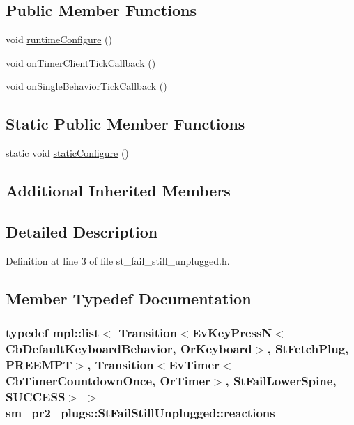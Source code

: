 \subsection*{Public Member Functions}
\begin{DoxyCompactItemize}
\item 
void \hyperlink{structsm__pr2__plugs_1_1StFailStillUnplugged_af8704d60b24ec65be825b5dc416632d1}{runtime\+Configure} ()
\item 
void \hyperlink{structsm__pr2__plugs_1_1StFailStillUnplugged_a9778180fa18c15f2d94c774ebde4c7cf}{on\+Timer\+Client\+Tick\+Callback} ()
\item 
void \hyperlink{structsm__pr2__plugs_1_1StFailStillUnplugged_ac9dc49f0681e4d6a17b30461881b9572}{on\+Single\+Behavior\+Tick\+Callback} ()
\end{DoxyCompactItemize}
\subsection*{Static Public Member Functions}
\begin{DoxyCompactItemize}
\item 
static void \hyperlink{structsm__pr2__plugs_1_1StFailStillUnplugged_a42820633846d0c87f9793a11b484d292}{static\+Configure} ()
\end{DoxyCompactItemize}
\subsection*{Additional Inherited Members}


\subsection{Detailed Description}


Definition at line 3 of file st\+\_\+fail\+\_\+still\+\_\+unplugged.\+h.



\subsection{Member Typedef Documentation}
\subsubsection[{\texorpdfstring{reactions}{reactions}}]{\setlength{\rightskip}{0pt plus 5cm}typedef mpl\+::list$<$ Transition$<$Ev\+Key\+PressN$<$Cb\+Default\+Keyboard\+Behavior, {\bf Or\+Keyboard}$>$, {\bf St\+Fetch\+Plug}, {\bf P\+R\+E\+E\+M\+PT}$>$, Transition$<$Ev\+Timer$<$Cb\+Timer\+Countdown\+Once, {\bf Or\+Timer}$>$, {\bf St\+Fail\+Lower\+Spine}, {\bf S\+U\+C\+C\+E\+SS}$>$ $>$ {\bf sm\+\_\+pr2\+\_\+plugs\+::\+St\+Fail\+Still\+Unplugged\+::reactions}}\hypertarget{structsm__pr2__plugs_1_1StFailStillUnplugged_a58dc75afc3040293cac801248a1c999c}{}\label{structsm__pr2__plugs_1_1StFailStillUnplugged_a58dc75afc3040293cac801248a1c999c}



